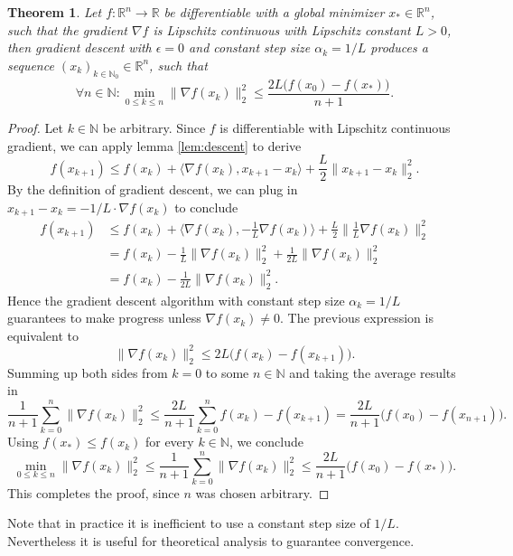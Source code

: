 \documentclass[11pt, a4paper]{article}
\newtheorem{theorem}{Theorem}[section]
\newcommand{\N}{\mathds{N}}
\newcommand{\R}{\mathds{R}}
\begin{document}
\begin{theorem} \label{thm:descent}
Let $f: \R^n \to \R$ be differentiable with a global minimizer $x_* \in \R^n$, such that the gradient $\nabla f$ is Lipschitz continuous with Lipschitz constant $L>0$, then gradient descent with $\epsilon = 0$ and constant step size $\alpha_k = 1/L$ produces a sequence $(x_k)_{k \in \N_0} \in \R^n$, such that 
\[ \forall n \in \N : \min_{0 \leq k \leq n} \big \| \nabla f(x_k) \big \|_2^2 \leq \frac{2L \big ( f(x_0) - f(x_*) \big )}{n+1}. \]
\end{theorem}

\begin{proof}
Let $k \in \N$ be arbitrary. Since $f$ is differentiable with Lipschitz continuous gradient, we can apply lemma \ref{lem:descent} to derive
\[  f(x_{k+1}) \leq f(x_k) + \big \langle \nabla f(x_k) , x_{k+1} -x_k \big \rangle + \frac{L}{2} \big \| x_{k+1} - x_k \big \|_2^2. \]
By the definition of gradient descent, we can plug in $x_{k+1} - x_k = - 1/L \cdot \nabla f(x_k)$ to conclude
\[ \begin{split} 
f(x_{k+1}) 
&\leq f(x_k) + \big \langle \nabla f(x_k) , - \frac{1}{L} \nabla f(x_k) \big \rangle + \frac{L}{2} \big \| \frac{1}{L} \nabla f(x_k) \big \|_2^2 \\\
&= f(x_k) - \frac{1}{L} \big \| \nabla f(x_k) \big \|_2^2 + \frac{1}{2L} \big \| \nabla f(x_k) \big \|_2^2 \\\
&= f(x_k) - \frac{1}{2L} \big \| \nabla f(x_k) \big \|_2^2.
\end{split} \]
Hence the gradient descent algorithm with constant step size $\alpha_k = 1/L$ guarantees to make progress unless $\nabla f(x_k) \neq 0$. The previous expression is equivalent to
\[ \big \| \nabla f(x_k) \big \|_2^2 \leq 2L \big ( f(x_k) - f(x_{k+1}) \big ). \]
Summing up both sides from $k=0$ to some $n \in \N$ and taking the average results in
\[ \frac{1}{n+1} \sum_{k=0}^{n} \big \| \nabla f(x_k) \big \|_2^2 \leq \frac{2L}{n+1} \sum_{k=0}^{n} f(x_k) - f(x_{k+1}) = \frac{2L}{n+1} \big ( f(x_0) - f(x_{n+1}) \big ). \]
Using $f(x_*) \leq f(x_k)$ for every $k \in \N$, we conclude
\[ \min_{0 \leq k \leq n} \big \| \nabla f(x_k) \big \|_2^2 \leq \frac{1}{n+1} \sum_{k=0}^{n} \big \| \nabla f(x_k) \big \|_2^2 \leq \frac{2L}{n+1} \big ( f(x_0) - f(x_*) \big ). \]
This completes the proof, since $n$ was chosen arbitrary.
\end{proof}

Note that in practice it is inefficient to use a constant step size of $1/L$. Nevertheless it is useful for theoretical analysis to guarantee convergence. \\
\end{document}
